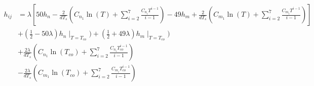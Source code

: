 \documentclass{article}   	%
\begin{document}
\begin{equation}
  \begin{split}
    h_{ij} &= \lambda\left[50 h_n - \frac{2}{dT_s}\left(C_{n_1}\ln(T) + \sum_{i=2}^{7} \frac{C_{n_i} T^{i-1}}{i-1} \right)
    -49 h_m + \frac{2}{dT_s}\left(C_{m_1}\ln(T) + \sum_{i=2}^{7} \frac{C_{m_i} T^{i-1}}{i-1} \right)\right] \\
    &+ (\frac{1}{2}-50\lambda)h_n\mid_{T=T_{co}}) + (\frac{1}{2}+49\lambda)h_m\mid_{T=T_{co}}) \\
    &+\frac{2\lambda}{dT_s}\left(C_{n_1}\ln(T_{co}) + \sum_{i=2}^{7} \frac{C_{n_i} T_{co}^{i-1}}{i-1}\right) \\
    &-\frac{2\lambda}{dT_s}\left(C_{m_1}\ln(T_{co}) + \sum_{i=2}^{7} \frac{C_{m_i} T_{co}^{i-1}}{i-1}\right)
    \label{final}
  \end{split}
\end{equation}
\end{document}
